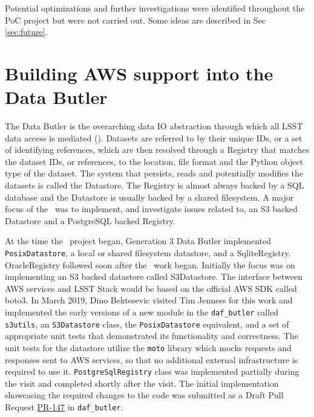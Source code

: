 Potential optimizations and further investigations were identified throughout the PoC project but were not carried out.
Some ideas are described in Sec \ref{sec:future}.


\section{Building AWS support into the Data Butler}
\label{sec:butler}

The Data Butler is the overarching data IO abstraction through which all LSST data access is mediated ().
Datasets are referred to by their unique IDs, or a set of identifying references, which are then resolved through a Registry that matches the dataset IDs, or references, to the location, file format and the Python object type of the dataset.
The system that persists, reads and potentially modifies the datasets is called the Datastore.
The Registry is almost always backed by a SQL database and the Datastore is usually backed by a shared filesystem.
A major focus of the \poc~was to implement, and investigate issues related to, an S3 backed Datastore and a PostgreSQL backed Registry.

At the time the \poc~project began, Generation 3 Data Butler implemented \texttt{PosixDatastore}, a local or shared filesystem datastore, and a SqliteRegistry.
OracleRegistry followed soon after the \poc~work began.
Initially the focus was on implementing an S3 backed datastore called S3Datastore.
The interface between AWS services and LSST Stack would be based on the official AWS SDK called boto3.
In March 2019, Dino Bektesevic visited Tim Jenness for this work and implemented the early versions of a new module in the \texttt{daf\_butler} called \texttt{s3utils}, an \texttt{S3Datastore} class, the \texttt{PosixDatastore} equivalent, and a set of appropriate unit tests that demonstrated its functionality and correctness.
The unit tests for the datastore utilize the \texttt{moto} library which mocks requests and responses sent to AWS services, so that no additional external infrastructure is required to use it.
\texttt{PostgreSqlRegistry} class was implemented partially during the visit and completed shortly after the visit.
The initial implementation showcasing the required changes to the code was submitted as a Draft Pull Request \href{https://github.com/lsst/daf_butler/pull/147}{PR-147} in \texttt{daf\_butler}.

